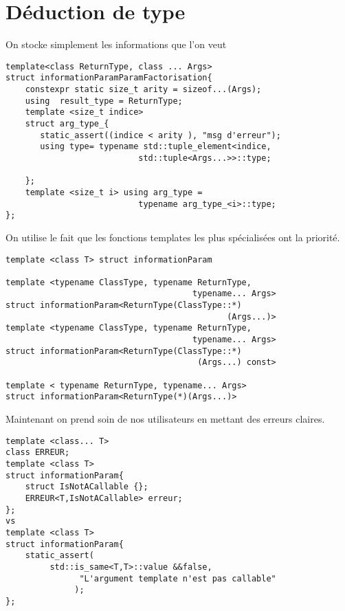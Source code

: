 \documentclass{beamer}
\begin{document}
\section{Déduction de type}
\begin{frame}[containsverbatim]
On stocke simplement les informations que l'on veut
\begin{lstlisting}
template<class ReturnType, class ... Args>
struct informationParamParamFactorisation{
    constexpr static size_t arity = sizeof...(Args);
    using  result_type = ReturnType;
    template <size_t indice>
    struct arg_type_{
       static_assert((indice < arity ), "msg d'erreur");
       using type= typename std::tuple_element<indice,
                           std::tuple<Args...>>::type;

    };
    template <size_t i> using arg_type = 
                           typename arg_type_<i>::type;
};
\end{lstlisting}
\end{frame}
\begin{frame}[containsverbatim]
On utilise le fait que les fonctions templates les plus spécialisées ont la priorité.
\begin{lstlisting}
template <class T> struct informationParam 

template <typename ClassType, typename ReturnType,
                                      typename... Args>
struct informationParam<ReturnType(ClassType::*)
                                             (Args...)>
template <typename ClassType, typename ReturnType,
                                      typename... Args>
struct informationParam<ReturnType(ClassType::*)
                                       (Args...) const>

template < typename ReturnType, typename... Args>
struct informationParam<ReturnType(*)(Args...)>
\end{lstlisting}

\end{frame} 


 

\begin{frame}[containsverbatim]
Maintenant on prend soin de nos utilisateurs en mettant des erreurs claires. 
\begin{lstlisting}
template <class... T>
class ERREUR;
template <class T>
struct informationParam{
    struct IsNotACallable {};
    ERREUR<T,IsNotACallable> erreur;
};
vs
template <class T>
struct informationParam{
    static_assert(
         std::is_same<T,T>::value &&false,
               "L'argument template n'est pas callable"
              );
};

\end{lstlisting}
\end{frame}
\end{document}
